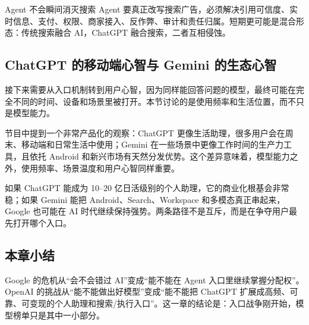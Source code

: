 \begin{warningbox}{Agent 不会瞬间消灭搜索}
Agent 要真正改写搜索广告，必须解决引用可信度、实时信息、支付、权限、商家接入、反作弊、审计和责任归属。短期更可能是混合形态：传统搜索融合 AI，ChatGPT 融合搜索，二者互相侵蚀。
\end{warningbox}

\subsection{ChatGPT 的移动端心智与 Gemini 的生态心智}

接下来需要从入口机制转到用户心智，因为同样能回答问题的模型，最终可能在完全不同的时间、设备和场景里被打开。本节讨论的是使用频率和生活位置，而不只是模型能力。

节目中提到一个非常产品化的观察：ChatGPT 更像生活助理，很多用户会在周末、移动端和日常生活中使用；Gemini 在一些场景中更像工作时间的生产力工具，且依托 Android 和新兴市场有天然分发优势。这个差异意味着，模型能力之外，使用频率、场景温度和用户心智同样重要。

如果 ChatGPT 能成为 10--20 亿日活级别的个人助理，它的商业化根基会非常稳；如果 Gemini 能把 Android、Search、Workspace 和多模态真正串起来，Google 也可能在 AI 时代继续保持强势。两条路径不是互斥，而是在争夺用户最先打开哪个入口。

\subsection{本章小结}

Google 的危机从“会不会错过 AI”变成“能不能在 Agent 入口里继续掌握分配权”。OpenAI 的挑战从“能不能做出好模型”变成“能不能把 ChatGPT 扩展成高频、可靠、可变现的个人助理和搜索/执行入口”。这一章的结论是：入口战争刚开始，模型榜单只是其中一小部分。

